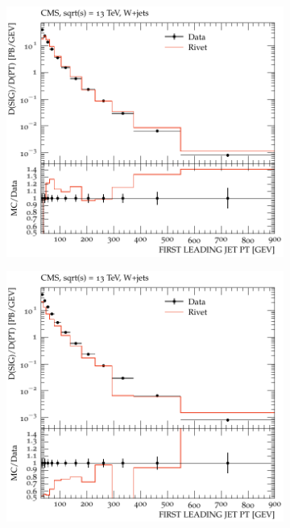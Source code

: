 \documentclass{beamer}
\begin{document}
\begin{frame}
\begin{figure}[!h]
\begin{subfigure}[b]{0.44\textwidth}
\centering
\includegraphics[width=\textwidth]{pictures/MCTunig/FIRST_LEADING_JET_PT}
\caption{\label{FIRST_LEADING_JET_PTTune}}
\end{subfigure}
\begin{subfigure}[b]{0.44\textwidth}
\centering
\includegraphics[width=\textwidth]{pictures/MCTunig/FIRST_LEADING_JET_PT_Nelson}
\caption{\label{FIRST_LEADING_JET_PT}}
\end{subfigure}
\caption{  }
\end{figure}


\end{frame}
\end{document}
